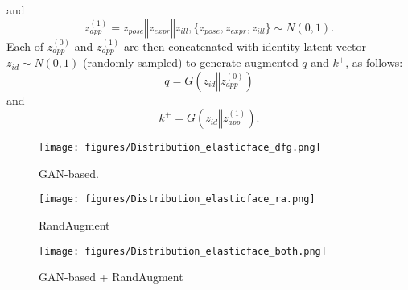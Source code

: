 \documentclass[10pt,twocolumn,letterpaper]{ieeeconf}
\begin{document}
    and
\begin{equation}
    z_{app}^{(1)} = z_{pose}\mathbin\Vert z_{expr}\mathbin\Vert z_{ill}, \{z_{pose}, z_{expr},  z_{ill}\} \sim N(0,1).
\end{equation}
Each of $z_{app}^{(0)}$ and $z_{app}^{(1)}$ are then concatenated with identity latent vector $z_{id} \sim N(0,1)$ (randomly sampled) to generate augmented $q$ and $k^+$, as follows:
\begin{equation}
   q = G(z_{id}\mathbin\Vert z_{app}^{(0)})
\end{equation}
   and
\begin{equation}
   k^+ = G(z_{id}\mathbin\Vert z_{app}^{(1)}).
\end{equation}

























\begin{figure*}[ht!]
	\centering
    \begin{subfigure}[b]{0.24\textwidth}
        \centering
        \texttt{[image: figures/Distribution\_elasticface\_dfg.png]}
        \caption{GAN-based.}
        \label{fig:DFG_distribution}
    \end{subfigure}
\begin{subfigure}[b]{0.24\textwidth}
        \centering
        \texttt{[image: figures/Distribution\_elasticface\_ra.png]}
        \caption{RandAugment}
        \label{fig:RA_distribution}
    \end{subfigure}
\begin{subfigure}[b]{0.24\textwidth}
        \centering
        \texttt{[image: figures/Distribution\_elasticface\_both.png]}
        \caption{GAN-based + RandAugment}
        \label{fig:DFG_RA_distribution}
    \end{subfigure}
    \vspace{-2mm}
	\caption{The genuine (blue) and imposter (orange) score distributions of three different data augmentation settings. The genuine pairs are constructed using GAN-based augmentation (Figure \ref{fig:DFG_distribution}), RandAugment (Figure \ref{fig:RA_distribution}), and GAN-based with RandAugment (Figure \ref{fig:DFG_RA_distribution}). The biggest effect is noticed when combining both augmentations.}
	\label{fig:identity_distributions}
	\vspace{-4mm}
\end{figure*}
\end{document}
